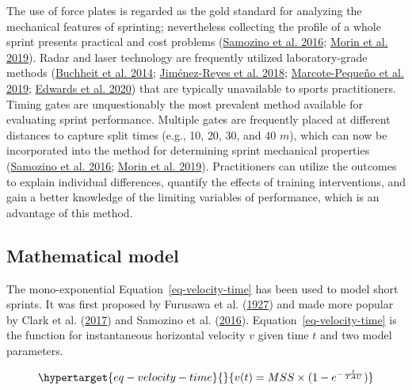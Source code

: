 \documentclass[
  letterpaper,
  DIV=11,
  numbers=noendperiod]{scrartcl}
\begin{document}
The use of force plates is regarded as the gold standard for analyzing
the mechanical features of sprinting; nevertheless collecting the
profile of a whole sprint presents practical and cost problems
(\protect\hyperlink{ref-samozinoSimpleMethodMeasuring2016}{Samozino et
al. 2016}; \protect\hyperlink{ref-morinSimpleMethodComputing2019}{Morin
et al. 2019}). Radar and laser technology are frequently utilized
laboratory-grade methods
(\protect\hyperlink{ref-buchheitMechanicalDeterminantsAcceleration2014}{Buchheit
et al. 2014};
\protect\hyperlink{ref-jimenez-reyesRelationshipVerticalHorizontal2018}{Jiménez-Reyes
et al. 2018};
\protect\hyperlink{ref-marcote-pequenoAssociationForceVelocity2019}{Marcote-Pequeño
et al. 2019};
\protect\hyperlink{ref-edwardsSprintAccelerationCharacteristics2020}{Edwards
et al. 2020}) that are typically unavailable to sports practitioners.
Timing gates are unquestionably the most prevalent method available for
evaluating sprint performance. Multiple gates are frequently placed at
different distances to capture split times (e.g., 10, 20, 30, and 40
\(m\)), which can now be incorporated into the method for determining
sprint mechanical properties
(\protect\hyperlink{ref-samozinoSimpleMethodMeasuring2016}{Samozino et
al. 2016}; \protect\hyperlink{ref-morinSimpleMethodComputing2019}{Morin
et al. 2019}). Practitioners can utilize the outcomes to explain
individual differences, quantify the effects of training interventions,
and gain a better knowledge of the limiting variables of performance,
which is an advantage of this method.

\hypertarget{mathematical-model}{%
\subsection{Mathematical model}\label{mathematical-model}}

The mono-exponential Equation~\ref{eq-velocity-time} has been used to
model short sprints. It was first proposed by Furusawa et al.
(\protect\hyperlink{ref-doi:10.1098ux2frspb.1927.0035}{1927}) and made
more popular by Clark et al.
(\protect\hyperlink{ref-clarkNFLCombine40Yard2017}{2017}) and Samozino
et al.
(\protect\hyperlink{ref-samozinoSimpleMethodMeasuring2016}{2016}).
Equation~\ref{eq-velocity-time} is the function for instantaneous
horizontal velocity \(v\) given time \(t\) and two model parameters.

\begin{equation}\protect\hypertarget{eq-velocity-time}{}{
  v(t) = MSS \times (1 - e^{-\frac{t}{TAU}}) 
}\label{eq-velocity-time}\end{equation}
\end{document}
